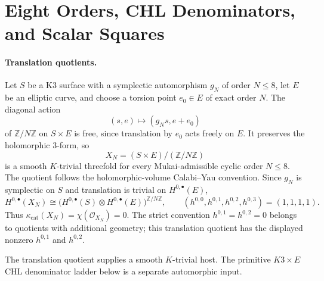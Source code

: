 \providecommand{\kBKM}{\kappa_{\mathrm{BKM}}}
\providecommand{\kch}{\kappa_{\mathrm{ch}}}
\providecommand{\kcat}{\kappa_{\mathrm{cat}}}
\providecommand{\cO}{\mathcal{O}}
\providecommand{\ZZ}{\mathbb{Z}}
\providecommand{\PP}{\mathbb{P}}
\providecommand{\gDelta}{\mathfrak{g}_{\Delta_5}}
\providecommand{\Spf}{\mathrm{Sp}_4(\ZZ)}
\providecommand{\DeltaFive}{\Delta_5}
\providecommand{\PhiTenUN}{\Phi_{10}^{\mathrm{un}}}
\providecommand{\PhiTenOP}{\Phi_{10}^{\mathrm{OP}}}
\providecommand{\Dfive}{D_5}
\providecommand{\ZOP}{Z_{\mathrm{OP}}}
\providecommand{\wt}{\operatorname{wt}}
\providecommand{\kfib}{\kappa_{\mathrm{fiber}}}
\providecommand{\kchHeis}{\kappa_{\mathrm{ch}}^{\mathrm{Heis}}}
\providecommand{\CoHA}{\mathrm{CoHA}}
\providecommand{\cW}{\mathcal{W}}
\providecommand{\bC}{\mathbb{C}}

\section*{Eight Orders, CHL Denominators, and Scalar Squares}

\paragraph{Translation quotients.}
Let \(S\) be a K3 surface with a symplectic automorphism \(g_N\) of
order \(N\leq8\), let \(E\) be an elliptic curve, and choose a torsion
point \(e_0\in E\) of exact order \(N\). The diagonal action
\[
  (s,e)\longmapsto(g_Ns,e+e_0)
\]
of \(\ZZ/N\ZZ\) on \(S\times E\) is free, since translation by
\(e_0\) acts freely on \(E\). It preserves the holomorphic \(3\)-form,
so
\[
  X_N=(S\times E)/(\ZZ/N\ZZ)
\]
is a smooth \(K\)-trivial threefold for every Mukai-admissible cyclic
order \(N\leq8\). The quotient follows the holomorphic-volume
Calabi--Yau convention. Since \(g_N\) is symplectic on \(S\) and
translation is trivial on \(H^{0,\bullet}(E)\),
\[
  H^{0,\bullet}(X_N)
  \cong
  \bigl(H^{0,\bullet}(S)\otimes H^{0,\bullet}(E)\bigr)^{\ZZ/N\ZZ},
  \qquad
  (h^{0,0},h^{0,1},h^{0,2},h^{0,3})=(1,1,1,1).
\]
Thus \(\kcat(X_N)=\chi(\cO_{X_N})=0\). The strict convention
\(h^{0,1}=h^{0,2}=0\) belongs to quotients with additional geometry; this
translation quotient has the displayed nonzero \(h^{0,1}\) and
\(h^{0,2}\).

The translation quotient supplies a smooth \(K\)-trivial host. The
primitive \(K3\times E\) CHL denominator ladder below is a separate
automorphic input.

